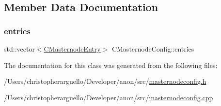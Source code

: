 \subsection{Member Data Documentation}
\mbox{\label{class_c_masternode_config_a6e8060eb502559efef8444ca2b19ac9a}} 
\subsubsection{\texorpdfstring{entries}{entries}}
{\footnotesize\ttfamily std\+::vector$<$\mbox{\hyperlink{class_c_masternode_config_1_1_c_masternode_entry}{C\+Masternode\+Entry}}$>$ C\+Masternode\+Config\+::entries\hspace{0.3cm}{\ttfamily [private]}}



The documentation for this class was generated from the following files\+:\begin{DoxyCompactItemize}
\item 
/\+Users/christopherarguello/\+Developer/anon/src/\mbox{\hyperlink{masternodeconfig_8h}{masternodeconfig.\+h}}\item 
/\+Users/christopherarguello/\+Developer/anon/src/\mbox{\hyperlink{masternodeconfig_8cpp}{masternodeconfig.\+cpp}}\end{DoxyCompactItemize}
